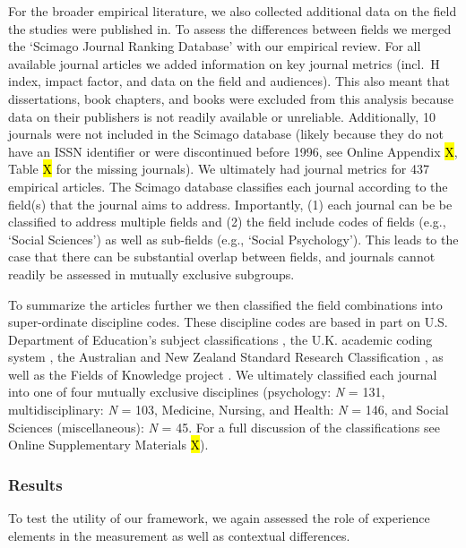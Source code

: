 For the broader empirical literature, we also collected additional data
on the field the studies were published in. To assess the differences
between fields we merged the `Scimago Journal Ranking Database'
\citep{SCImago2020} with our empirical review. For all available journal
articles we added information on key journal metrics (incl.~H index,
impact factor, and data on the field and audiences). This also meant
that dissertations, book chapters, and books were excluded from this
analysis because data on their publishers is not readily available or
unreliable. Additionally, 10 journals were not included in the Scimago
database (likely because they do not have an ISSN identifier or were
discontinued before 1996, see Online Appendix \hl{X}, Table \hl{X} for
the missing journals). We ultimately had journal metrics for 437
empirical articles. The Scimago database classifies each journal
according to the field(s) that the journal aims to address. Importantly,
(1) each journal can be be classified to address multiple fields and (2)
the field include codes of fields (e.g., `Social Sciences') as well as
sub-fields (e.g., `Social Psychology'). This leads to the case that
there can be substantial overlap between fields, and journals cannot
readily be assessed in mutually exclusive subgroups.

To summarize the articles further we then classified the field
combinations into super-ordinate discipline codes. These discipline
codes are based in part on U.S. Department of Education's subject
classifications \citep[i.e., CIP;][]{InstituteofEducationSciences2020},
the U.K. academic coding system
\citep[JACS 3.0;][]{HigherEducationStatisticsAgency2013}, the Australian
and New Zealand Standard Research Classification
\citep[ANZSRC 2020;][]{AustralianBureauofStatistics2020}, as well as the
Fields of Knowledge project \citep{ThingsmadeThinkable2014}. We
ultimately classified each journal into one of four mutually exclusive
disciplines (psychology: \textit{N} = 131, multidisciplinary: \textit{N}
= 103, Medicine, Nursing, and Health: \textit{N} = 146, and Social
Sciences (miscellaneous): \textit{N} = 45. For a full discussion of the
classifications see Online Supplementary Materials \hl{X}).

\subsubsection{Results}

To test the utility of our framework, we again assessed the role of
experience elements in the measurement as well as contextual
differences.

